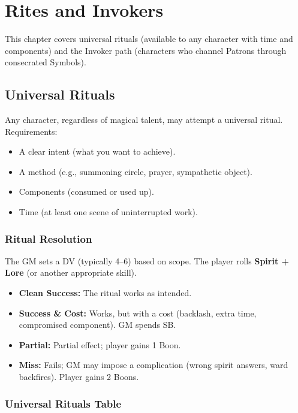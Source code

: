 
\section{Rites and Invokers}

This chapter covers universal rituals (available to any character with time and components) and the Invoker path (characters who channel Patrons through consecrated Symbols).

\subsection{Universal Rituals}

Any character, regardless of magical talent, may attempt a universal ritual. Requirements:

\begin{itemize}
  \item A clear intent (what you want to achieve).
  \item A method (e.g., summoning circle, prayer, sympathetic object).
  \item Components (consumed or used up).
  \item Time (at least one scene of uninterrupted work).
\end{itemize}

\subsubsection{Ritual Resolution}
The GM sets a DV (typically 4–6) based on scope. The player rolls \textbf{Spirit + Lore} (or another appropriate skill).

\begin{itemize}
  \item \textbf{Clean Success:} The ritual works as intended.
  \item \textbf{Success \& Cost:} Works, but with a cost (backlash, extra time, compromised component). GM spends SB.
  \item \textbf{Partial:} Partial effect; player gains 1 Boon.
  \item \textbf{Miss:} Fails; GM may impose a complication (wrong spirit answers, ward backfires). Player gains 2 Boons.
\end{itemize}

\subsubsection{Universal Rituals Table}

